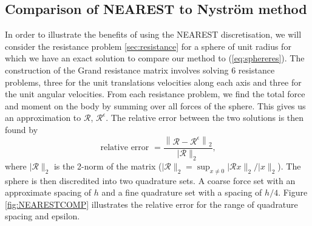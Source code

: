 \subsection{Comparison of NEAREST to Nyström method}
In order to illustrate the benefits of using the NEAREST discretisation, we will consider the resistance problem \cref{sec:resistance} for a sphere of unit radius for which we have an exact solution to compare our method to (\cref{eq:sphereres}). The construction of the Grand resistance matrix involves solving $6$ resistance problems, three for the unit translations velocities along each axis and three for the unit angular velocities. From each resistance problem, we find the total force and moment on the body by summing over all forces of the sphere. This gives us an approximation to $\mathcal{R}$, $\mathcal{R}^\epsilon$. The relative error between the two solutions is then found by 
\begin{equation}
    \text { relative error }=\frac{\left\lVert \mathcal{R}-\mathcal{R}^{\epsilon}\right\rVert_{2}}{\lvert\mathcal{R}\rVert_{2}} \text {, }
    \label{eq:RelativeError}
\end{equation}
where ${\lvert\mathcal{R}\rVert_{2}}$ is the 2-norm of the matrix ($\lvert\mathcal{R}\rVert_{2}=\sup_{x \neq 0}\lvert\mathcal{R}x\rVert_{2} /\lvert x\rVert_{2}$).
The sphere is then discredited into two quadrature sets. A coarse force set with an approximate spacing of $h$ and a fine quadrature set with a spacing of $h/4$. Figure \ref{fig:NEARESTCOMP} illustrates the relative error for the range of quadrature spacing and epsilon. 
